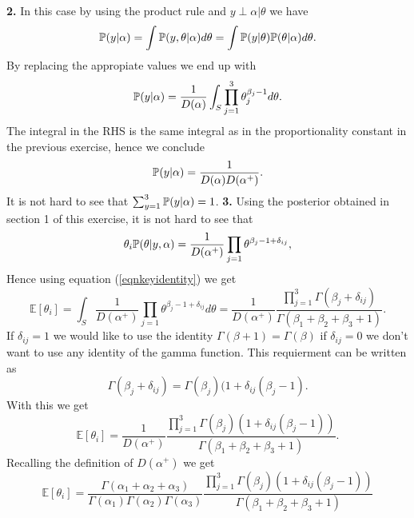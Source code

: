 \documentclass{article}
\begin{document}
\textbf{2.}
\newline
In this case by using the product rule and $y\perp\alpha|\theta$ we have
\begin{equation*}
\mathbb{P}(y|\alpha)=\int\mathbb{P}(y,\theta|\alpha)d\theta=\int\mathbb{P}(y|\theta)\mathbb{P}(\theta|\alpha)d\theta.
\end{equation*}
By replacing the appropiate values we end up with
\begin{equation*}
\mathbb{P}(y|\alpha)=\frac{1}{D(\alpha)}\int_{S}\prod_{j=1}^{3}\theta_j^{\beta_{j}-1}d\theta.
\end{equation*}
The integral in the RHS is the same integral as in the proportionality constant in the previous exercise, hence we conclude
\begin{equation*}
\mathbb{P}(y|\alpha)=\frac{1}{D(\alpha)D(\alpha^{+})}.
\end{equation*}
It is not hard to see that $\sum_{y=1}^{3}\mathbb{P}(y|\alpha)=1$.
\newline
\newline
\textbf{3.}
\newline
Using the posterior obtained in section 1 of this exercise, it is not hard to see that 
\begin{equation*}
\theta_{i}\mathbb{P}(\theta|y,\alpha)=\frac{1}{D(\alpha^{+})}\prod_{j=1}\theta^{\beta_{j}-1+\delta_{ij}},
\end{equation*}
Hence using equation (\ref{eqnkeyidentity}) we get
\begin{equation*}
\mathbb{E}[\theta_{i}]=\int_{S}\frac{1}{D(\alpha^{+})}\prod_{j=1}\theta^{\beta_{j}-1+\delta_{ij}}d\theta=\frac{1}{D(\alpha^{+})}
\frac{\prod_{j=1}^{3}\Gamma(\beta_{j}+\delta_{ij})}{\Gamma(\beta_{1}+\beta_{2}+\beta_{3}+1)}.
\end{equation*}
If $\delta_{ij}=1$ we would like to use the identity $\Gamma(\beta+1)=\Gamma(\beta)$ if $\delta_{ij}=0$ we don't want to use any identity
of the gamma function. This requierment can be written as
\begin{equation*}
\Gamma(\beta_{j}+\delta_{ij})=\Gamma(\beta_{j})(1+\delta_{ij}(\beta_{j}-1).
\end{equation*}
With this we get
\begin{equation*}
\mathbb{E}[\theta_{i}]=\frac{1}{D(\alpha^{+})}
\frac{\prod_{j=1}^{3}\Gamma(\beta_{j})(1+\delta_{ij}(\beta_{j}-1))}{\Gamma(\beta_{1}+\beta_{2}+\beta_{3}+1)}.
\end{equation*}
Recalling the definition of $D(\alpha^{+})$ we get
\begin{equation*}
\mathbb{E}[\theta_{i}]=\frac{\Gamma(\alpha_1+\alpha_2+\alpha_3)}{\Gamma(\alpha_1)\Gamma(\alpha_2)\Gamma(\alpha_3)}
\frac{\prod_{j=1}^{3}\Gamma(\beta_{j})(1+\delta_{ij}(\beta_{j}-1))}{\Gamma(\beta_{1}+\beta_{2}+\beta_{3}+1)}
\end{equation*}
\end{document}
